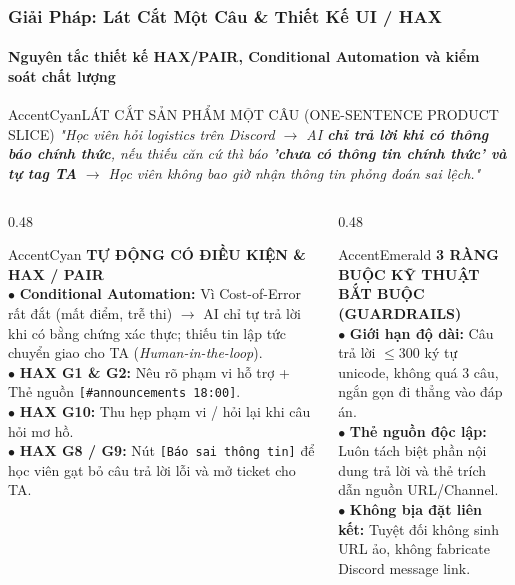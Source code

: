 \documentclass[aspectratio=169,10pt]{beamer}
\begin{document}
\begin{frame}
  \frametitle{Giải Pháp: Lát Cắt Một Câu \& Thiết Kế UI / HAX}
  \framesubtitle{Nguyên tắc thiết kế HAX/PAIR, Conditional Automation và kiểm soát chất lượng}

  \begin{calloutbox}{AccentCyan}{LÁT CẮT SẢN PHẨM MỘT CÂU (ONE-SENTENCE PRODUCT SLICE)}
    \footnotesize\centering
    \textit{"Học viên hỏi logistics trên Discord $\rightarrow$ AI \textbf{chỉ trả lời khi có thông báo chính thức}, nếu thiếu căn cứ thì báo \textbf{'chưa có thông tin chính thức' và tự tag TA} $\rightarrow$ Học viên không bao giờ nhận thông tin phỏng đoán sai lệch."}
  \end{calloutbox}

  \vspace{0.15cm}
  \begin{columns}[T]
    \begin{column}{0.48\textwidth}
      \begin{glassbox}{AccentCyan}
        {\scriptsize \textbf{\color{AccentCyan}TỰ ĐỘNG CÓ ĐIỀU KIỆN \& HAX / PAIR}}\\[0.1cm]
        \tiny
        $\bullet$ \textbf{Conditional Automation:} Vì Cost-of-Error rất đắt (mất điểm, trễ thi) $\rightarrow$ AI chỉ tự trả lời khi có bằng chứng xác thực; thiếu tin lập tức chuyển giao cho TA (\textit{Human-in-the-loop}).\\[0.1cm]
        $\bullet$ \textbf{HAX G1 \& G2:} Nêu rõ phạm vi hỗ trợ + Thẻ nguồn \texttt{[\#announcements 18:00]}.\\[0.1cm]
        $\bullet$ \textbf{HAX G10:} Thu hẹp phạm vi / hỏi lại khi câu hỏi mơ hồ.\\[0.1cm]
        $\bullet$ \textbf{HAX G8 / G9:} Nút \texttt{[Báo sai thông tin]} để học viên gạt bỏ câu trả lời lỗi và mở ticket cho TA.
      \end{glassbox}
    \end{column}

    \begin{column}{0.48\textwidth}
      \begin{glassbox}{AccentEmerald}
        {\scriptsize \textbf{\color{AccentEmerald}3 RÀNG BUỘC KỸ THUẬT BẮT BUỘC (GUARDRAILS)}}\\[0.1cm]
        \tiny
        $\bullet$ \textbf{Giới hạn độ dài:} Câu trả lời $\le 300$ ký tự unicode, không quá 3 câu, ngắn gọn đi thẳng vào đáp án.\\[0.1cm]
        $\bullet$ \textbf{Thẻ nguồn độc lập:} Luôn tách biệt phần nội dung trả lời và thẻ trích dẫn nguồn URL/Channel.\\[0.1cm]
        $\bullet$ \textbf{Không bịa đặt liên kết:} Tuyệt đối không sinh URL ảo, không fabricate Discord message link.
      \end{glassbox}
    \end{column}
  \end{columns}
\end{frame}
\end{document}
